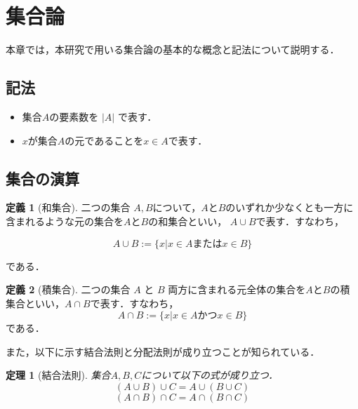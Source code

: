 \documentclass[12pt]{jsreport}
\theoremstyle{plain} %
\newtheorem{theorem}{定理}
\theoremstyle{definition}
\newtheorem{definition}{定義}
\begin{document}
\section{集合論}

本章では，本研究で用いる集合論の基本的な概念と記法について説明する\cite{book1}．

\subsection{記法}

\begin{itemize}
    \item 集合$A$の要素数を $|A|$ で表す．
    \item $x$が集合$A$の元であることを$x \in A$で表す．
\end{itemize}

\subsection{集合の演算}

\begin{definition}[和集合]
    二つの集合 $A, B$について，$A$と$B$のいずれか少なくとも一方に含まれるような元の集合を$A$と$B$の和集合といい， $A \cup B$で表す．すなわち，

    \begin{equation}
        A \cup B := \{x | x \in A または x \in B \}
    \end{equation}

    である．

\end{definition}

\begin{definition}[積集合]
    二つの集合 $A$ と $B$ 両方に含まれる元全体の集合を$A$と$B$の積集合といい，$A \cap B$で表す．すなわち，
    \begin{equation}
        A \cap B := \{x | x \in A かつ x \in B \}
    \end{equation}
    である．
\end{definition}

また，以下に示す結合法則と分配法則が成り立つことが知られている．
\begin{theorem}[結合法則]  集合$A, B, C$について以下の式が成り立つ．
    \begin{equation}
        (A \cup B) \cup C = A \cup (B \cup C)
    \end{equation}
    \begin{equation}
        (A \cap B) \cap C = A \cap (B \cap C)
    \end{equation}
\end{theorem}
\end{document}

